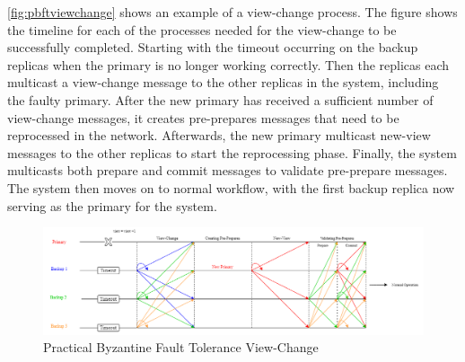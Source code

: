 \autoref{fig:pbftviewchange} shows an example of a view-change process. The figure shows the timeline for each of the processes needed for the view-change to be successfully completed. Starting with the timeout occurring on the backup replicas when the primary is no longer working correctly. Then the replicas each multicast a view-change message to the other replicas in the system, including the faulty primary. After the new primary has received a sufficient number of view-change messages, it creates pre-prepares messages that need to be reprocessed in the network. Afterwards, the new primary multicast new-view messages to the other replicas to start the reprocessing phase. Finally, the system multicasts both prepare and commit messages to validate pre-prepare messages. The system then moves on to normal workflow, with the first backup replica now serving as the primary for the system.


\begin{figure}[!h]
	\centering
	\includegraphics[width=1.1\textwidth]{figures/PBFTViewChange}
	\caption{Practical Byzantine Fault Tolerance View-Change}
	\label{fig:pbftviewchange}
\end{figure}


